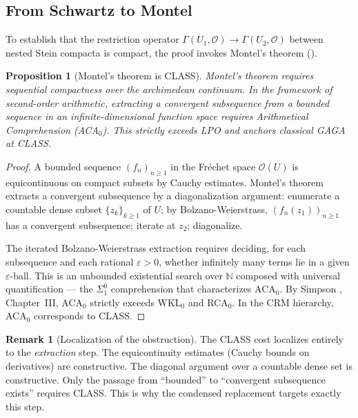 \documentclass[11pt,a4paper]{article}
\theoremstyle{plain}
\newtheorem{proposition}[theorem]{Proposition}
\theoremstyle{definition}
\newtheorem{remark}[theorem]{Remark}
\newcommand{\LPO}{\textsf{LPO}}
\newcommand{\CLASS}{\textsf{CLASS}}
\newcommand{\N}{\mathbb{N}}
\begin{document}
\subsection{From Schwartz to Montel}

To establish that the restriction operator $\Gamma(U_1, \mathcal{O}) \to \Gamma(U_2, \mathcal{O})$ between nested Stein compacta is compact, the proof invokes Montel's theorem ().

\begin{proposition}[Montel's theorem is \CLASS]\label{prop:montel-class}
Montel's theorem requires sequential compactness over the archimedean continuum.
In the framework of second-order arithmetic, extracting a convergent subsequence from a bounded sequence in an infinite-dimensional function space requires Arithmetical Comprehension (ACA$_0$).
This strictly exceeds \LPO{} and anchors classical GAGA at \CLASS.
\end{proposition}

\begin{proof}
A bounded sequence $(f_n)_{n \ge 1}$ in the Fréchet space $\mathcal{O}(U)$ is equicontinuous on compact subsets by Cauchy estimates.
Montel's theorem extracts a convergent subsequence by a diagonalization argument: enumerate a countable dense subset $\{z_k\}_{k \ge 1}$ of $U$; by Bolzano-Weierstrass, $(f_n(z_1))_{n \ge 1}$ has a convergent subsequence; iterate at $z_2$; diagonalize.

The iterated Bolzano-Weierstrass extraction requires deciding, for each subsequence and each rational $\varepsilon > 0$, whether infinitely many terms lie in a given $\varepsilon$-ball.
This is an unbounded existential search over $\N$ composed with universal quantification --- the $\Sigma^0_1$ comprehension that characterizes ACA$_0$.
By Simpson \cite{Simpson2009}, Chapter~III, ACA$_0$ strictly exceeds WKL$_0$ and RCA$_0$.
In the CRM hierarchy, ACA$_0$ corresponds to \CLASS.
\end{proof}

\begin{remark}[Localization of the obstruction]\label{rem:localization}
The \CLASS{} cost localizes entirely to the \emph{extraction} step.
The equicontinuity estimates (Cauchy bounds on derivatives) are constructive.
The diagonal argument over a countable dense set is constructive.
Only the passage from ``bounded'' to ``convergent subsequence exists'' requires \CLASS.
This is why the condensed replacement targets exactly this step.
\end{remark}
\end{document}
